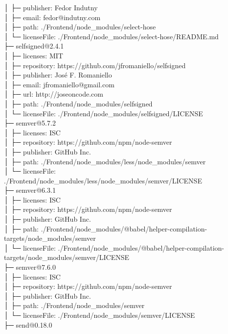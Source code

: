│  ├─ publisher: Fedor Indutny\\
│  ├─ email: fedor@indutny.com\\
│  ├─ path: ./Frontend/node\_modules/select-hose\\
│  └─ licenseFile: ./Frontend/node\_modules/select-hose/README.md\\
├─ selfsigned@2.4.1\\
│  ├─ licenses: MIT\\
│  ├─ repository: https://github.com/jfromaniello/selfsigned\\
│  ├─ publisher: José F. Romaniello\\
│  ├─ email: jfromaniello@gmail.com\\
│  ├─ url: http://joseoncode.com\\
│  ├─ path: ./Frontend/node\_modules/selfsigned\\
│  └─ licenseFile: ./Frontend/node\_modules/selfsigned/LICENSE\\
├─ semver@5.7.2\\
│  ├─ licenses: ISC\\
│  ├─ repository: https://github.com/npm/node-semver\\
│  ├─ publisher: GitHub Inc.\\
│  ├─ path: ./Frontend/node\_modules/less/node\_modules/semver\\
│  └─ licenseFile: ./Frontend/node\_modules/less/node\_modules/semver/LICENSE\\
├─ semver@6.3.1\\
│  ├─ licenses: ISC\\
│  ├─ repository: https://github.com/npm/node-semver\\
│  ├─ publisher: GitHub Inc.\\
│  ├─ path: ./Frontend/node\_modules/@babel/helper-compilation-targets/node\_modules/semver\\
│  └─ licenseFile: ./Frontend/node\_modules/@babel/helper-compilation-targets/node\_modules/semver/LICENSE\\
├─ semver@7.6.0\\
│  ├─ licenses: ISC\\
│  ├─ repository: https://github.com/npm/node-semver\\
│  ├─ publisher: GitHub Inc.\\
│  ├─ path: ./Frontend/node\_modules/semver\\
│  └─ licenseFile: ./Frontend/node\_modules/semver/LICENSE\\
├─ send@0.18.0\\

